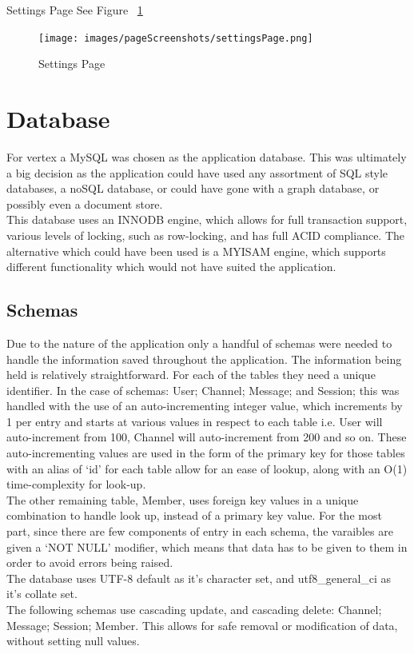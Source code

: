 Settings Page See Figure ~\ref{image:settingsPage}
\begin{figure}[h!]
    \caption{Settings Page}
    \label{image:settingsPage}
    \centering
    \texttt{[image: images/pageScreenshots/settingsPage.png]}
\end{figure}


\section{Database}
For vertex a MySQL was chosen as the application database. This was ultimately a big decision as the application could have used any assortment of SQL style databases, a noSQL database, or could have gone with a graph database, or possibly even a document store.
\\ This database uses an INNODB engine, which allows for full transaction support, various levels of locking, such as row-locking, and has full ACID compliance. The alternative which could have been used is a MYISAM engine, which supports different functionality which would not have suited the application.

\subsection{Schemas}
Due to the nature of the application only a handful of schemas were needed to handle the information saved throughout the application. The information being held is relatively straightforward. For each of the tables they need a unique identifier. In the case of schemas: User; Channel; Message; and Session; this was handled with the use of an auto-incrementing integer value, which increments by 1 per entry and starts at various values in respect to each table i.e. User will auto-increment from 100, Channel will auto-increment from 200 and so on. These auto-incrementing values are used in the form of the primary key for those tables with an alias of ‘id’ for each table allow for an ease of lookup, along with an O(1) time-complexity for look-up.
\\ The other remaining table, Member, uses foreign key values in a unique combination to handle look up, instead of a primary key value. For the most part, since there are few components of entry in each schema, the varaibles are given a ‘NOT NULL’ modifier, which means that data has to be given to them in order to avoid errors being raised.
\\ The database uses UTF-8 default as it’s character set, and utf8\_general\_ci as it’s collate set.
\\ The following schemas use cascading update, and cascading delete: Channel; Message; Session; Member. This allows for safe removal or modification of data, without setting null values.

